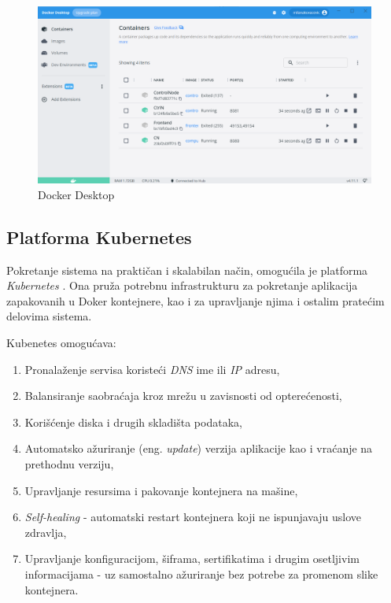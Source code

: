 \documentclass[12pt,oneside]{memoir}
\begin{document}
\begin{figure}[!ht]
  \centering
  \includegraphics[width=1.0\textwidth]{./images/docker_desktop.png}
  \caption{Docker Desktop}
  \label{fig:dockerdesktop}
\end{figure}

\subsection{Platforma Kubernetes}
\label{subs:kubernetes_platform}

Pokretanje sistema na praktičan i skalabilan način, omogućila je platforma \emph{Kubernetes} \cite{Kubernetes}. Ona pruža potrebnu infrastrukturu za pokretanje aplikacija zapakovanih u Doker kontejnere, kao i za upravljanje njima i ostalim pratećim delovima sistema.

Kubenetes omogućava:
\begin{enumerate}
\item Pronalaženje servisa koristeći \emph{DNS} ime ili \emph{IP} adresu,
\item Balansiranje saobraćaja kroz mrežu u zavisnosti od opterećenosti,
\item Korišćenje diska i drugih skladišta podataka,
\item Automatsko ažuriranje (eng. \emph{update}) verzija aplikacije kao i vraćanje na prethodnu verziju,
\item Upravljanje resursima i pakovanje kontejnera na mašine,
\item \emph{Self-healing} - automatski restart kontejnera koji ne ispunjavaju uslove zdravlja,
\item Upravljanje konfiguracijom, šiframa, sertifikatima i drugim osetljivim informacijama - uz samostalno ažuriranje bez potrebe za promenom slike kontejnera.
\end{enumerate}
\end{document}

